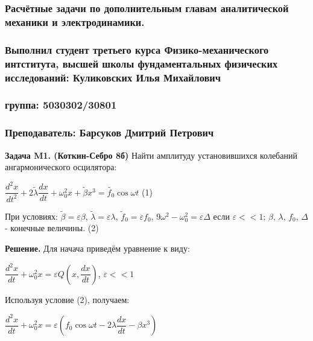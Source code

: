 \documentclass[a4paper, 12pt]{article}
\begin{document}
	\begin{center}
		\subsubsection*{Расчётные задачи по дополнительным главам аналитической механики и электродинамики.}
		\subsubsection*{Выполнил студент третьего курса Физико-механического интститута, высшей школы фундаментальных физических исследований: Куликовских Илья Михайлович}
		\subsubsection*{группа: 5030302/30801}
		\subsubsection*{Преподаватель: Барсуков Дмитрий Петрович}
	\end{center}
	
	\quad \textbf{Задача M1. (Коткин-Себро 8б)} Найти амплитуду установившихся колебаний ангармонического осцилятора:
	
	\begin{center}
		$\dfrac{d^2 x }{dt^2} + 2\tilde{\lambda} \dfrac{dx}{dt} + \omega_0^2  x + \tilde{\beta} x^3 = \tilde{f_0} \cos\omega t$ (1)
	\end{center} 
	
	\quad При условиях:  $\tilde\beta = \varepsilon\beta$, $\tilde\lambda = \varepsilon\lambda$, $\tilde f_0 = \varepsilon f_0$, $9\omega^2 - \omega_0^2 = \varepsilon\Delta$  если $\varepsilon << 1$; $\beta$, $\lambda$, $f_0$, $\Delta$ - конечные величины. (2)
	
	\quad \textbf{Решение.} Для начача приведём уравнение к виду:
	
	\begin{center}
		$ \dfrac{d^2 x}{dt} + \omega_0^2 x = \varepsilon Q\left(x, \dfrac{dx}{dt}\right)$, $\varepsilon << 1$
	\end{center}
	
	\quad Используя условие (2), получаем:
	
	\begin{center}
		$ \dfrac{d^2 x}{dt} + \omega_0^2 x = \varepsilon \left( f_0 \cos\omega t - 2\lambda\dfrac{dx}{dt} - \beta x^3 \right)$
	\end{center}
	
\end{document}
